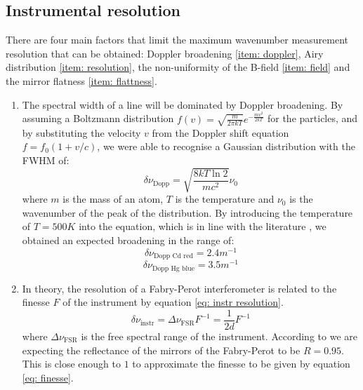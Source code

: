 \documentclass[11pt]{article}
\begin{document}
\subsection{Instrumental resolution}
There are four main factors that limit the maximum wavenumber measurement resolution that can be obtained: Doppler broadening \ref{item: doppler}, Airy distribution \ref{item: resolution}, the non-uniformity of the B-field \ref{item: field} and the mirror flatness \ref{item: flattness}. 
\begin{enumerate}[label=(\alph*), ref=(\alph*)]
  \item \label{item: doppler} The spectral width of a line will be dominated by Doppler broadening. By assuming a Boltzmann distribution $f(v) = \sqrt{\frac{m}{2 \pi k T}} e^{-\frac{mv^2}{2kT}}$ for the particles, and by substituting the velocity $v$ from the Doppler shift equation $f = f_0 (1+v/c)$, we were able to recognise a Gaussian distribution with the FWHM of: 
  \begin{equation}
      \delta \nu_{\mathrm{Dopp}} = \sqrt{\frac{8 k T \ln{2}}{mc^2}} \nu_0
  \end{equation}
  where $m$ is the mass of an atom, $T$ is the temperature and $\nu_0$ is the wavenumber of the peak of the distribution. By introducing the temperature of $T = 500 \si{K}$ into the equation, which is in line with the literature \cite{doi:10.1098/rspa.1936.0108}, we obtained an expected broadening in the range of:
  \begin{equation}
      \delta \nu_{\text{Dopp Cd red}} = 2.4 \si{m^{-1}} \label{eq: nu doppler}
  \end{equation}
  \begin{equation}
      \delta \nu_{\text{Dopp Hg blue}} = 3.5 \si{m^{-1}}
  \end{equation}
  \item \label{item: resolution} In theory, the resolution of a Fabry-Perot interferometer is related to the finesse $F$ of the instrument by equation \eqref{eq: instr resolution}. 
  \begin{equation} \label{eq: instr resolution}
      \delta \nu_{\text{instr}} = \Delta \nu_{\text{FSR}} F^{-1} = \frac{1}{2d} F^{-1}
  \end{equation}
  where $\Delta \nu_{\text{FSR}}$ is the free spectral range of the instrument. According to \cite{FabryPerotEtalonGuide} we are expecting the reflectance of the mirrors of the Fabry-Perot to be $R = 0.95$. This is close enough to $1$ to approximate the finesse to be given by equation \eqref{eq: finesse}. 

\end{enumerate}
\end{document}
